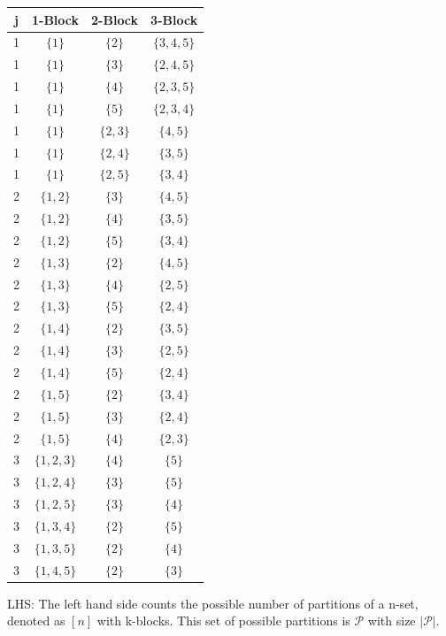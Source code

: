 \documentclass{article}
\begin{document}
\begin{center}
\begin{tabular}{ |c|c|c|c| } 
\hline
j & 1-Block & 2-Block & 3-Block \\
\hline
1 & $\{1\}$ & $\{2\}$ & $\{3, 4, 5\}$ \\
1 & $\{1\}$ & $\{3\}$ & $\{2, 4, 5\}$ \\
1 & $\{1\}$ & $\{4\}$ & $\{2, 3, 5\}$ \\
1 & $\{1\}$ & $\{5\}$ & $\{2, 3, 4\}$ \\ 
1 & $\{1\}$ & $\{2, 3\}$ & $\{4, 5\}$ \\ 
1 & $\{1\}$ & $\{2, 4\}$ & $\{3, 5\}$ \\
1 & $\{1\}$ & $\{2, 5\}$ & $\{3, 4\}$ \\
2 & $\{1,2\}$ & $\{3\}$ & $\{4, 5\}$ \\
2 & $\{1,2\}$ & $\{4\}$ & $\{3, 5\}$ \\
2 & $\{1,2\}$ & $\{5\}$ & $\{3, 4\}$ \\
2 & $\{1,3\}$ & $\{2\}$ & $\{4, 5\}$ \\
2 & $\{1,3\}$ & $\{4\}$ & $\{2, 5\}$ \\
2 & $\{1,3\}$ & $\{5\}$ & $\{2, 4\}$ \\
2 & $\{1,4\}$ & $\{2\}$ & $\{3, 5\}$ \\
2 & $\{1,4\}$ & $\{3\}$ & $\{2, 5\}$ \\
2 & $\{1,4\}$ & $\{5\}$ & $\{2, 4\}$ \\
2 & $\{1,5\}$ & $\{2\}$ & $\{3, 4\}$ \\
2 & $\{1,5\}$ & $\{3\}$ & $\{2, 4\}$ \\
2 & $\{1,5\}$ & $\{4\}$ & $\{2, 3\}$ \\
3 & $\{1,2,3\}$ & $\{4\}$ & $\{5\}$ \\
3 & $\{1,2,4\}$ & $\{3\}$ & $\{5\}$ \\
3 & $\{1,2,5\}$ & $\{3\}$ & $\{4\}$ \\
3 & $\{1,3,4\}$ & $\{2\}$ & $\{5\}$ \\
3 & $\{1,3,5\}$ & $\{2\}$ & $\{4\}$ \\ 
3 & $\{1,4,5\}$ & $\{2\}$ & $\{3\}$ \\  
 \hline
\end{tabular}
\end{center}

LHS: The left hand side counts the possible number of partitions of a n-set, denoted as $[n]$ with k-blocks. This set of possible partitions is $\mathcal{P}$ with size $|\mathcal{P}|$.
\end{document}
